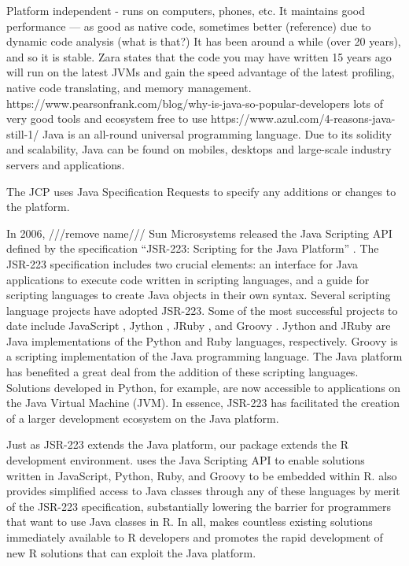 Platform independent - runs on computers, phones, etc.
It maintains good performance --- as good as native code, sometimes better (reference) due to dynamic code analysis (what is that?)
It has been around a while (over 20 years), and so it is stable.  Zara states that the code you may have written 15 years ago will run on the latest JVMs and gain the speed advantage of the latest profiling, native code translating, and memory management. https://www.pearsonfrank.com/blog/why-is-java-so-popular-developers
lots of very good tools and ecosystem
free to use
https://www.azul.com/4-reasons-java-still-1/
Java is an all-round universal programming language. Due to its solidity and scalability, Java can be found on mobiles, desktops and large-scale industry servers and applications.


The JCP uses Java Specification Requests to specify any additions or changes to the platform.

In 2006, ///remove name/// Sun Microsystems released the Java Scripting API \citep{jsa} defined by the specification “JSR-223: Scripting for the Java Platform” \citep{jsr223spec}. The JSR-223 specification includes two crucial elements: an interface for Java applications to execute code written in scripting languages, and a guide for scripting languages to create Java objects in their own syntax. Several scripting language projects have adopted JSR-223. Some of the most successful projects to date include JavaScript \citep{jsnashorn}, Jython \citep{jython}, JRuby \citep{jruby}, and Groovy \citep{groovy}. Jython and JRuby are Java implementations of the Python \citep{python} and Ruby \citep{ruby} languages, respectively. Groovy is a scripting implementation of the Java programming language. The Java platform has benefited a great deal from the addition of these scripting languages. Solutions developed in Python, for example, are now accessible to applications on the Java Virtual Machine (JVM). In essence, JSR-223 has facilitated the creation of a larger development ecosystem on the Java platform.

Just as JSR-223 extends the Java platform, our  package extends the R development environment.  uses the Java Scripting API to enable solutions written in JavaScript, Python, Ruby, and Groovy to be embedded within R.  also provides simplified access to Java classes through any of these languages by merit of the JSR-223 specification, substantially lowering the barrier for programmers that want to use Java classes in R. In all,  makes countless existing solutions immediately available to R developers and promotes the rapid development of new R solutions that can exploit the Java platform.

